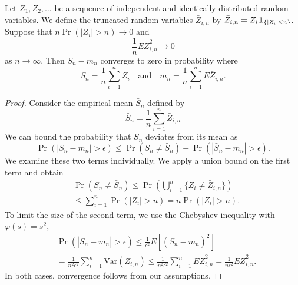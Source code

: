 \begin{lemma} \label{lemma:WeakLawTruncated}
Let $Z_1, Z_2, \ldots$ be a sequence of independent and identically distributed random variables.
We define the truncated random variables $\bar{Z}_{i,n}$ by $\bar{Z}_{i,n} = Z_i \mathrm{1\!\!1}_{\{ |Z_i| \leq n \}}$.
Suppose that $n \Pr (|Z_i| > n) \rightarrow 0$ and
\begin{equation*}
\frac{1}{n} E \bar{Z}_{i,n}^2 \rightarrow 0
\end{equation*}
as $n \rightarrow \infty$.
Then $S_n - m_n$ converges to zero in probability where
\begin{equation*}
S_n = \frac{1}{n} \sum_{i=1}^n Z_i
\quad \text{and} \quad
m_n = \frac{1}{n} \sum_{i=1}^n E \bar{Z}_{i,n}.
\end{equation*}
\end{lemma}
\begin{proof}
Consider the empirical mean $\bar{S}_n$ defined by
\begin{equation*}
\bar{S}_n = \frac{1}{n} \sum_{i=1}^n \bar{Z}_{i,n}
\end{equation*}
We can bound the probability that $S_n$ deviates from its mean as
\begin{equation*}
\Pr (|S_n - m_n| > \epsilon)
\leq \Pr \left( S_n \neq \bar{S}_n \right) + \Pr ( |\bar{S}_n - m_n| > \epsilon) .
\end{equation*}
We examine these two terms individually.
We apply a union bound on the first term and obtain
\begin{equation*}
\begin{split}
&\Pr \left( S_n \neq \bar{S}_n \right)
\leq \Pr \left( \bigcup_{i=1}^n \{ Z_i \neq \bar{Z}_{i,n} \} \right) \\
&\leq \sum_{i=1}^n \Pr (|Z_i| > n) = n \Pr (|Z_i| > n) .
\end{split}
\end{equation*}
To limit the size of the second term, we use the Chebyshev inequality with $\varphi(s) = s^2$,
\begin{equation*}
\begin{split}
&\Pr \left( |\bar{S}_n - m_n| > \epsilon \right)
\leq \frac{1}{\epsilon^2} E \left[ \left( \bar{S}_n - m_n \right)^2 \right] \\
&= \frac{1}{n^2 \epsilon^2} \sum_{i=1}^n \mathrm{Var} \left( \bar{Z}_{i,n} \right)
\leq \frac{1}{n^2 \epsilon^2} \sum_{i=1}^n E \bar{Z}_{i,n}^2
= \frac{1}{n \epsilon^2} E \bar{Z}_{i,n}^2 .
\end{split}
\end{equation*}
In both cases, convergence follows from our assumptions.
\end{proof}

